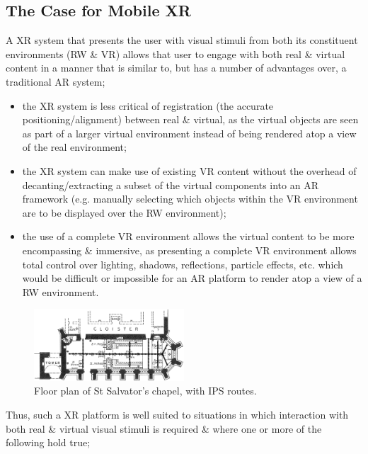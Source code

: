 \documentclass[conference]{acmsiggraph}
\begin{document}


\subsection{The Case for Mobile XR}


A XR system that presents the user with visual stimuli from both its constituent environments (RW \& VR) allows that user to engage with both real \& virtual content in a manner that is similar to, but has a number of advantages over, a traditional AR system;

\begin{itemize}
	\item the XR system is less critical of registration (the accurate positioning/alignment) between real \& virtual, as the virtual objects are seen as part of a larger virtual environment instead of being rendered atop a view of the real environment;
	\item the XR system can make use of existing VR content without the overhead of decanting/extracting a subset of the virtual components into an AR framework (e.g. manually selecting which objects within the VR environment are to be displayed over the RW environment);
	\item the use of a complete VR environment allows the virtual content to be more encompassing \& immersive, as presenting a complete VR environment allows total control over lighting, shadows, reflections, particle effects, etc. which would be difficult or impossible for an AR platform to render atop a view of a RW environment.
\end{itemize}

\begin{figure}[h]
	\begin{center}
		\includegraphics[width=0.5\textwidth]{images/sallies_layout.png}
		\caption{Floor plan of St Salvator's chapel, with IPS routes.}
		\label{sallies_layout}
	\end{center}
\end{figure}
Thus, such a XR platform is well suited to situations in which interaction with both real \& virtual visual stimuli is required \& where one or more of the following hold true;
\end{document}
